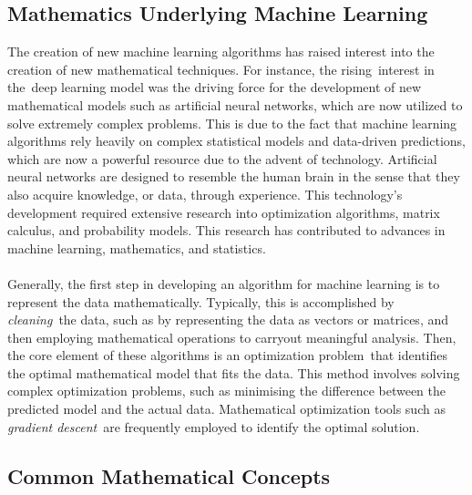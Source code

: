 \documentclass{article}[12pt]
\theoremstyle{definition}
\begin{document}
\bigskip

\subsection{Mathematics Underlying Machine Learning}

\bigskip

The creation of new machine learning algorithms has raised interest into the creation of new mathematical techniques. For instance, the rising interest in the deep learning model was the driving force for the development of new mathematical models such as artificial neural networks, which are now utilized to solve extremely complex problems. This is due to the fact that machine learning algorithms rely heavily on complex statistical models and data-driven predictions, which are now a powerful resource due to the advent of technology. Artificial neural networks are designed to resemble the human brain in the sense that they also acquire knowledge, or data, through experience. This technology's development required extensive research into optimization algorithms, matrix calculus, and probability models. This research has contributed to advances in machine learning, mathematics, and statistics.
\\
\\
Generally, the first step in developing an algorithm for machine learning is to represent the data mathematically. Typically, this is accomplished by \emph{cleaning} the data, such as by representing the data as vectors or matrices, and then employing mathematical operations to carryout meaningful analysis. Then, the core element of these algorithms is an optimization problem that identifies the optimal mathematical model that fits the data. This method involves solving complex optimization problems, such as minimising the difference between the predicted model and the actual data. Mathematical optimization tools such as \emph{gradient descent} are frequently employed to identify the optimal solution.

\noindent

\bigskip

\subsection{Common Mathematical Concepts}

\bigskip
\end{document}
